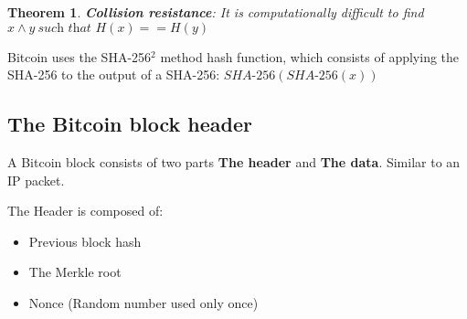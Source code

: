 \documentclass[a4paper, 12pt]{report}
\newtheorem{theorem}{Theorem}
\begin{document}
\begin{theorem}
    \textbf{Collision resistance}: It is computationally difficult
    to find $x\land y\ \textit{such that } H(x)==H(y)$
\end{theorem}

Bitcoin uses the SHA-256$^2$ method hash function,
which consists of applying the SHA-256 to the output of 
a SHA-256: $\textit{SHA-}256(\textit{SHA-}256(x))$
\subsection{The Bitcoin block header}
A Bitcoin block consists of two parts \textbf{The header} and 
\textbf{The data}. Similar to an IP packet. 

The Header is composed of:
\begin{itemize}
    \item Previous block hash
    \item The Merkle root
    \item Nonce (Random number used only once)
\end{itemize}
\end{document}
